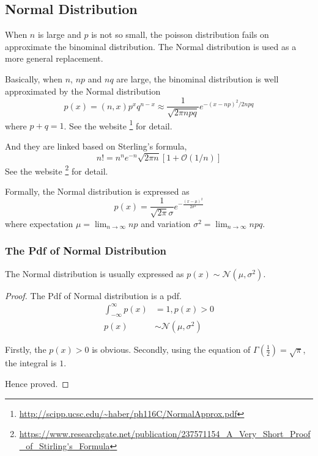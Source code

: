 \subsection{Normal Distribution}
When $n$ is large and $p$ is not so small, the poisson distribution fails on approximate the binominal distribution.
The Normal distribution is used as a more general replacement.

Basically, when $n$, $np$ and $nq$ are large, the binominal distribution is well approximated by the Normal distribution
\begin{equation*}
    p(x) = (n, x) p^x q^{n-x} \approx
    \frac{1}{\sqrt{2 \pi n p q}}
    e^{-(x-np)^2/2npq}
\end{equation*}
where $p+q=1$.
See the website \footnote{\url{http://scipp.ucsc.edu/~haber/ph116C/NormalApprox.pdf}} for detail.

And they are linked based on Sterling's formula,
\begin{equation}
    \label{Equation: Sterling's formula}
    n! = n^n e^{-n} \sqrt{2 \pi n} [1 + \mathcal{O}(1/n)]
\end{equation}
See the website \footnote{\url{https://www.researchgate.net/publication/237571154_A_Very_Short_Proof_of_Stirling's_Formula}} for detail.

Formally, the Normal distribution is expressed as
\begin{equation}
    \label{Equation: Pdf of Normal distribution}
    p(x) = \frac{1}{\sqrt{2 \pi} \sigma} e^{-\frac{(x-\mu)^2}{2 \sigma^2}}
\end{equation}
where expectation $\mu = \lim_{n \rightarrow \infty} np$ and variation $\sigma^2 = \lim_{n \rightarrow \infty} npq$.

\subsubsection{The Pdf of Normal Distribution}
The Normal distribution is usually expressed as $p(x) \sim \mathcal{N}(\mu, \sigma^2)$.

\begin{proof}
    The Pdf of Normal distribution is a pdf.
    \begin{align*}
        \int_{-\infty}^{\infty} p(x) & = 1, p(x) > 0                   \\
        p(x)                         & \sim \mathcal{N}(\mu, \sigma^2)
    \end{align*}

    Firstly, the $p(x) > 0$ is obvious.
    Secondly, using the equation of $\Gamma(\frac{1}{2}) = \sqrt{\pi}$,
    the integral is $1$.

    Hence proved.
\end{proof}

